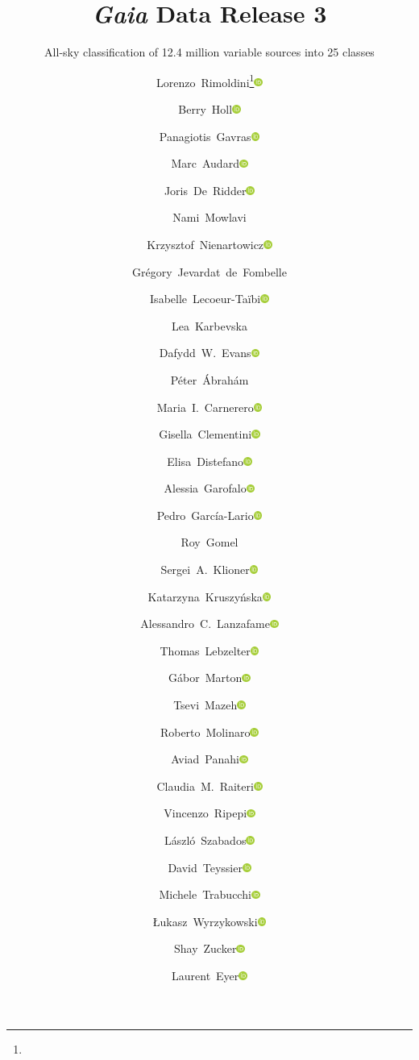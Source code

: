 \documentclass[longauth]{aa}
\newcommand{\orcit}[1]{\protect\href{https://orcid.org/#1}{\protect\includegraphics[width=8pt]{orcid.png}}}
\def\gaia{\textit{Gaia}\xspace}
\begin{document}
 

\title{\gaia Data Release 3}
\subtitle{All-sky classification of 12.4 million variable sources into 25 classes}

\author{Lorenzo~Rimoldini\inst{\ref{inst-ch-eco}}\fnmsep\thanks{}\orcit{0000-0002-0306-585X}
\and
Berry~Holl\inst{\ref{inst-ch-eco},\ref{inst-ch-obs}}\orcit{0000-0001-6220-3266}
\and
Panagiotis~Gavras\inst{\ref{inst-es-rhea}}\orcit{0000-0002-4383-4836}
\and
Marc~Audard\inst{\ref{inst-ch-eco},\ref{inst-ch-obs}}\orcit{0000-0003-4721-034X}
\and
Joris~De~Ridder\inst{\ref{inst-be-ku}}\orcit{0000-0001-6726-2863}
\and
Nami~Mowlavi\inst{\ref{inst-ch-eco},\ref{inst-ch-obs}}
\and
Krzysztof~Nienartowicz\inst{\ref{inst-ch-sed}}\orcit{0000-0001-5415-0547}
\and
Gr\'{e}gory~Jevardat~de~Fombelle\inst{\ref{inst-ch-eco}}
\and
Isabelle~Lecoeur-Ta\"ibi\inst{\ref{inst-ch-eco}}\orcit{0000-0003-0029-8575}
\and
Lea~Karbevska\inst{\ref{inst-ch-eco},\ref{inst-fr}}
\and
Dafydd~W.~Evans\inst{\ref{inst-uk-ioa}}\orcit{0000-0002-6685-5998}
\and
P\'{e}ter~\'{A}brah\'{a}m\inst{\ref{inst-hu-obs},\ref{inst-hu-mta}}
\and
Maria~I.~Carnerero\inst{\ref{inst-it-to}}\orcit{0000-0001-5843-5515}
\and 
Gisella~Clementini\inst{\ref{inst-it-bo}}\orcit{0000-0001-9206-9723}
\and
Elisa~Distefano\inst{\ref{inst-it-ct1}}\orcit{0000-0002-2448-2513}
\and
Alessia~Garofalo\inst{\ref{inst-it-bo}}\orcit{0000-0002-5907-0375}
\and
Pedro~Garc\'{i}a-Lario\inst{\ref{inst-es-esa}}\orcit{0000-0003-4039-8212}
\and
Roy~Gomel\inst{\ref{inst-il-ta1}}
\and
Sergei~A.~Klioner\inst{\ref{inst-de-dre}}\orcit{0000-0003-4682-7831}
\and
Katarzyna~Kruszy{\'n}ska\inst{\ref{inst-pl-wa}}\orcit{0000-0002-2729-5369}
\and
Alessandro~C.~Lanzafame\inst{\ref{inst-it-ct1},\ref{inst-it-ct2}}\orcit{0000-0002-2697-3607}
\and
Thomas~Lebzelter\inst{\ref{inst-at-vie}}\orcit{0000-0002-0702-7551}
\and
G\'{a}bor~Marton\inst{\ref{inst-hu-obs}}\orcit{0000-0002-1326-1686}
\and
Tsevi~Mazeh\inst{\ref{inst-il-ta1}}\orcit{0000-0002-3569-3391}
\and
Roberto~Molinaro\inst{\ref{inst-it-na}}\orcit{0000-0003-3055-6002}
\and
Aviad~Panahi\inst{\ref{inst-il-ta1}}\orcit{0000-0001-5850-4373}
\and
Claudia~M.~Raiteri\inst{\ref{inst-it-to}}\orcit{0000-0003-1784-2784}
\and
Vincenzo~Ripepi\inst{\ref{inst-it-na}}\orcit{0000-0003-1801-426X}
\and
L\'{a}szl\'{o}~Szabados\inst{\ref{inst-hu-obs}}\orcit{0000-0002-2046-4131}
\and
David~Teyssier\inst{\ref{inst-es-tel}}\orcit{0000-0002-6261-5292}
\and
Michele~Trabucchi\inst{\ref{inst-ch-obs}}\orcit{0000-0002-1429-2388}
\and
{\L}ukasz~Wyrzykowski\inst{\ref{inst-pl-wa}}\orcit{0000-0002-9658-6151}
\and
Shay~Zucker\inst{\ref{inst-il-ta2}}\orcit{0000-0003-3173-3138}
\and
Laurent~Eyer\inst{\ref{inst-ch-obs}}\orcit{0000-0002-0182-8040}
}
\end{document}
